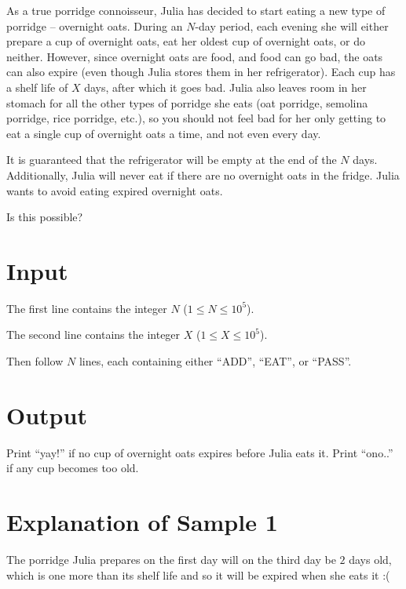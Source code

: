 
As a true porridge connoisseur, Julia has decided to start eating a new type of porridge --
overnight oats. During an $N$-day period, each evening she will either prepare a cup of overnight
oats, eat her oldest cup of overnight oats, or do neither. However, since overnight oats are food,
and food can go bad, the oats can also expire (even though Julia stores them in her refrigerator).
Each cup has a shelf life of $X$ days, after which it goes bad. Julia also leaves room in her
stomach for all the other types of porridge she eats (oat porridge, semolina porridge, rice
porridge, etc.), so you should not feel bad for her only getting to eat a single cup of overnight
oats a time, and not even every day.

It is guaranteed that the refrigerator will be empty at the end of the $N$ days. Additionally, Julia
will never eat if there are no overnight oats in the fridge. Julia wants to avoid eating expired
overnight oats.

Is this possible?

\section*{Input}

The first line contains the integer $N$ ($1 \leq N \leq 10^5$).

The second line contains the integer $X$ ($1 \leq X \leq 10^5$).

Then follow $N$ lines, each containing either ``ADD'', ``EAT'', or ``PASS''.

\section*{Output}

Print ``yay!'' if no cup of overnight oats expires before Julia eats it.
Print ``ono..'' if any cup becomes too old.

\section*{Explanation of Sample 1}

The porridge Julia prepares on the first day will on the third day be $2$ days old, which is one
more than its shelf life and so it will be expired when she eats it :(
